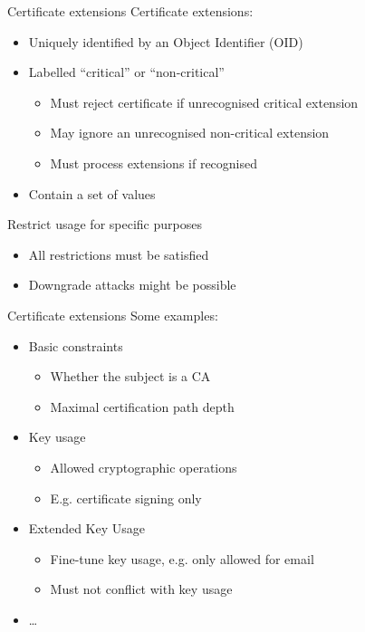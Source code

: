 \begin{frame}{Certificate extensions}
  Certificate extensions:
  \begin{itemize}[<+(1)->]
    \item Uniquely identified by an Object Identifier (OID)
    \item Labelled \enquote{critical} or \enquote{non-critical}
    \par
    \begin{itemize}
      \item Must reject certificate if unrecognised critical extension
      \item May ignore an unrecognised non-critical extension
      \item Must process extensions if recognised
    \end{itemize}
    \item Contain a set of values
  \end{itemize}

  \pause
  Restrict usage for specific purposes
  \begin{itemize}[<+(1)->]
    \item All restrictions must be satisfied
    \item Downgrade attacks might be possible
  \end{itemize}
\end{frame}

\begin{frame}{Certificate extensions}
  Some examples:
  \begin{itemize}[<+(1)->]
    \item Basic constraints
    \begin{itemize}
      \item Whether the subject is a CA
      \item Maximal certification path depth
    \end{itemize}
    \item Key usage
    \begin{itemize}
      \item Allowed cryptographic operations
      \item E.g. certificate signing only
    \end{itemize}
    \item Extended Key Usage
    \begin{itemize}
      \item Fine-tune key usage, e.g. only allowed for email
      \item Must not conflict with key usage
    \end{itemize}
    \item \dots
  \end{itemize}
\end{frame}

